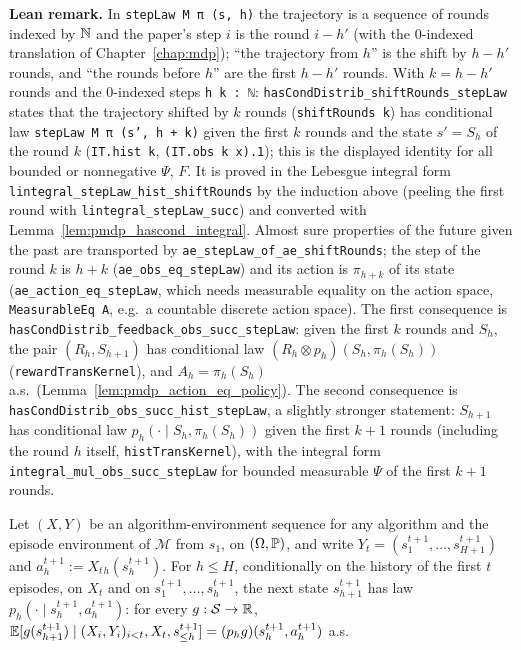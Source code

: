 \textbf{Lean remark.} In \texttt{stepLaw M π (s, h)} the trajectory is a sequence of rounds
indexed by $\mathbb{N}$ and the paper's step $i$ is the round $i - h'$ (with the $0$-indexed
translation of Chapter~\ref{chap:mdp}); ``the trajectory from $h$'' is the shift by $h - h'$
rounds, and ``the rounds before $h$'' are the first $h - h'$ rounds. With $k = h - h'$ rounds
and the $0$-indexed steps \texttt{h k : ℕ}:
\texttt{hasCondDistrib\_shiftRounds\_stepLaw} states that the trajectory shifted by $k$ rounds
(\texttt{shiftRounds k}) has conditional law \texttt{stepLaw M π (s', h + k)} given the first $k$ rounds
and the state $s' = S_h$ of the round $k$ (\texttt{IT.hist k}, \texttt{(IT.obs k x).1}); this is the
displayed identity for all bounded or nonnegative $\Psi$, $F$. It is proved in the Lebesgue integral
form \texttt{lintegral\_stepLaw\_hist\_shiftRounds} by the induction above (peeling the first round
with \texttt{lintegral\_stepLaw\_succ}) and converted with
Lemma~\ref{lem:pmdp_hascond_integral}. Almost sure properties of the future given the past are
transported by \texttt{ae\_stepLaw\_of\_ae\_shiftRounds}; the step of the round $k$ is $h + k$
(\texttt{ae\_obs\_eq\_stepLaw}) and its action is $\pi_{h+k}$ of its state
(\texttt{ae\_action\_eq\_stepLaw}, which needs measurable equality on the action space,
\texttt{MeasurableEq A}, e.g.\ a countable discrete action space). The first consequence is
\texttt{hasCondDistrib\_feedback\_obs\_succ\_stepLaw}: given the first $k$ rounds and $S_h$, the pair
$(R_h, S_{h+1})$ has conditional law $(R_h \otimes p_h)(S_h, \pi_h(S_h))$ (\texttt{rewardTransKernel}),
and $A_h = \pi_h(S_h)$ a.s.\ (Lemma~\ref{lem:pmdp_action_eq_policy}). The second consequence is
\texttt{hasCondDistrib\_obs\_succ\_hist\_stepLaw}, a slightly stronger statement: $S_{h+1}$ has
conditional law $p_h(\cdot \mid S_h, \pi_h(S_h))$ given the first $k + 1$ rounds (including the round
$h$ itself, \texttt{histTransKernel}), with the integral form \texttt{integral\_mul\_obs\_succ\_stepLaw}
for bounded measurable $\Psi$ of the first $k + 1$ rounds.

\begin{lemma}\label{lem:pmdp_episode_env_step}
\leanok
{}
Let $(X, Y)$ be an algorithm-environment sequence for any algorithm and the episode environment
of $\mathcal M$ from $s_1$, on $(\Omega, \mathbb{P})$, and write $Y_t = (s^{t+1}_1, \dots, s^{t+1}_{H+1})$
and $a^{t+1}_h := X_t{}_h(s^{t+1}_h)$. For $h \le H$, conditionally on the history of the first $t$
episodes, on $X_t$ and on $s^{t+1}_1, \dots, s^{t+1}_h$, the next state $s^{t+1}_{h+1}$ has law
$p_h(\cdot \mid s^{t+1}_h, a^{t+1}_h)$: for every $g : \mathcal{S} \to \mathbb{R}$,
$\mathbb{E}[g(s^{t+1}_{h+1}) \mid (X_i, Y_i)_{i < t}, X_t, s^{t+1}_{\le h}] = (p_h g)(s^{t+1}_h, a^{t+1}_h)$ a.s.
\end{lemma}

